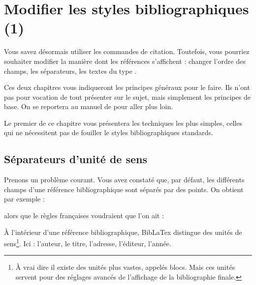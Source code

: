 \chapter{Modifier les styles bibliographiques (1)}

	\begin{prealable}
	
	Vous savez désormais utiliser les commandes de citation. Toutefois, vous pourriez souhaiter modifier la manière dont les références s'affichent :  changer l'ordre des champs, les séparateurs, les textes du type .
	
	Ces deux chapitres vous indiqueront les principes généraux pour le faire. Ils n'ont pas pour vocation de tout présenter sur le sujet, mais simplement les principes de base. On se reportera au manuel de  pour aller plus loin.
	
	Le premier de ce chapitre vous présentera les techniques les plus simples, celles qui ne nécessitent pas de fouiller le styles bibliographiques standards. 
	
	
	\end{prealable}
	
	
\section{Séparateurs d'unité de sens}\label{unitebiblio}
	
Prenons un problème courant. Vous avez constaté que, par défaut, les différents champs d'une référence bibliographique sont séparés par des points. On obtient par exemple :
	
	\renewcommand{\newunitpunct}[0]{\adddot\addspace} 
	
	\begin{quotation}
	\cite{Urner1952}
	\end{quotation}
	
alors que le règles françaises voudraient que l'on ait :
	
\renewcommand{\newunitpunct}[0]{\addcomma\addspace}
	
	\begin{quotation}
	\cite{Urner1952}
	\end{quotation}
	
À l'intérieur d'une référence bibliographique, BibLaTex distingue des unités de sens\footnote{À vrai dire il existe des unités plus vastes, appelés blocs. Mais ces unités servent pour des réglages avancés de l'affichage de la bibliographie finale.}. Ici : l'auteur, le titre, l'adresse, l'éditeur, l'année. 

